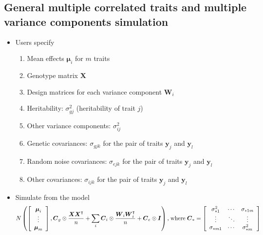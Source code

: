 \documentclass[12pt]{article}
\newcommand{\by}{\boldsymbol{y}}
\newcommand{\bC}{\boldsymbol{C}}
\newcommand{\bI}{\boldsymbol{I}}
\newcommand{\bW}{\boldsymbol{W}}
\newcommand{\bX}{\boldsymbol{X}}
\newcommand{\T}{\intercal}
\newcommand{\bmu}{\boldsymbol{\mu}}
\begin{document}
\begin{spacing}{1.0}
\subsection{General multiple correlated traits and multiple variance components simulation}

    \begin{itemize}
        \item Users specify
        \begin{enumerate}
            \item Mean effects $\bmu_i$ for $m$ traits
            \item Genotype matrix $\bX$
            \item Design matrices for each variance component $\bW_i$
            \item Heritability: $\sigma^2_{gj}$ (heritability of trait $j$)
            \item Other variance components: $\sigma^2_{ij}$
            \item Genetic covariances: $\sigma_{gjk}$ for the pair of traits $\by_j$ and $\by_l$
            \item Random noise covariances: $\sigma_{ejk}$ for the pair of traits $\by_j$ and $\by_l$
            \item Other covariances: $\sigma_{ijk}$ for the pair of traits $\by_j$ and $\by_l$
        \end{enumerate}                
        \item Simulate from the model
        \begin{equation*}
            \begin{split}
            N \left(
                \left[
                    \begin{array}{c}
                        \bmu_i \\
                        \vdots \\
                        \bmu_m
                    \end{array}
                \right],
                \bC_g  \otimes {\bX\bX^\T \over n}
                + \sum_i \bC_i \otimes {\bW_i\bW_i^\T \over n} + \bC_e \otimes \bI
              \right) \text{,\;where\;}
            \bC_* =
            \left[
                \begin{array}{ccc}
                    \sigma^2_{*1} & \cdots & \sigma_{*1m} \\
                    \vdots & \ddots & \vdots \\
                    \sigma_{*m1} & \cdots & \sigma^2_{*m}
                \end{array}
            \right]
           \end{split}
        \end{equation*}
    \end{itemize}

\end{spacing}
\end{document}
